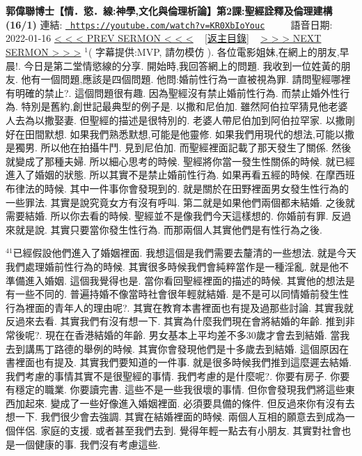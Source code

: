 \documentclass{book}
\begin{document}
\section{}
\label{sec:KR0XbIoYouc}
\textbf{郭偉聯博士【情．慾．線:神學,文化與倫理析論】第2課:聖經詮釋及倫理建構 (16/1)}
\newline
\newline
連結: \href{https://youtube.com/watch?v=KR0XbIoYouc}{\texttt{ https://youtube.com/watch?v=KR0XbIoYouc}} ~~~~ 語音日期: 2022-01-16 
\newline
\newline
\hyperref[sec:qH7MtIb583Y]{\small{< < < PREV SERMON < < <}}
~
\hyperref[sec:index]{\small{[返主目錄]}}
~
\hyperref[sec:wqj8hNAtWGc]{\small{> > > NEXT SERMON > > >}}
\newline
\newline
$^{1}$( 字幕提供:MVP, 請勿模仿 ).
各位電影姐妹,在網上的朋友,早晨!.
今日是第二堂情慾線的分享.
開始時,我回答網上的問題.
我收到一位姓黃的朋友.
他有一個問題,應該是四個問題.
他問:婚前性行為一直被視為罪.
請問聖經哪裡有明確的禁止?.
這個問題很有趣.
因為聖經沒有禁止婚前性行為.
而禁止婚外性行為.
特別是舊約,創世記最典型的例子是.
以撒和尼伯加.
雖然阿伯拉罕猜見他老婆人去為以撒娶妻.
但聖經的描述是很特別的.
老婆人帶尼伯加到阿伯拉罕家.
以撒剛好在田間默想.
如果我們熟悉默想,可能是他靈修.
如果我們用現代的想法,可能以撒是獨男.
所以他在拍攝牛鬥.
見到尼伯加.
而聖經裡面記載了那天發生了關係.
然後就變成了那種夫婦.
所以細心思考的時候.
聖經將你當一發生性關係的時候.
就已經進入了婚姻的狀態.
所以其實不是禁止婚前性行為.
如果再看五經的時候.
在摩西班布律法的時候.
其中一件事你會發現到的.
就是關於在田野裡面男女發生性行為的一些罪法.
其實是說究竟女方有沒有呼叫.
第二就是如果他們兩個都未結婚.
之後就需要結婚.
所以你去看的時候.
聖經並不是像我們今天這樣想的.
你婚前有罪.
反過來就是說.
其實只要當你發生性行為.
而那兩個人其實他們是有性行為之後.

$^{41}$已經假設他們進入了婚姻裡面.
我想這個是我們需要去釐清的一些想法.
就是今天我們處理婚前性行為的時候.
其實很多時候我們會純粹當作是一種淫亂.
就是他不準備進入婚姻.
這個我覺得也是.
當你看回聖經裡面的描述的時候.
其實他的想法是有一些不同的.
普遍持婚不像當時社會很年輕就結婚.
是不是可以同情婚前發生性行為裡面的青年人的理由呢?.
其實在教育本書裡面也有提及過那些討論.
其實我就反過來去看.
其實我們有沒有想一下.
其實為什麼我們現在會將結婚的年齡.
推到非常後呢?.
現在在香港結婚的年齡.
男女基本上平均差不多30歲才會去到結婚.
當我去到講馬丁路德的舉例的時候.
其實你會發現他們是十多歲去到結婚.
這個原因在書裡面也有提及.
其實我們要知道的一件事.
就是很多時候我們推到這麼遲去結婚.
我們考慮的事情其實不是很聖經的事情.
我們考慮的是什麼呢?.
你要有房子.
你要有穩定的職業.
你要讀完書.
這些不是一些我很壞的事情.
但你會發現我們將這些東西加起來.
變成了一些好像進入婚姻裡面.
必須要具備的條件.
但反過來你有沒有去想一下.
我們很少會去強調.
其實在結婚裡面的時候.
兩個人互相的願意去到成為一個伴侶.
家庭的支援.
或者甚至我們去到.
覺得年輕一點去有小朋友.
其實對社會也是一個健康的事.
我們沒有考慮這些.
\end{document}
